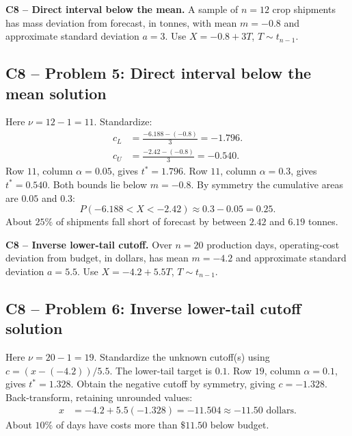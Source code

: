 {
\textbf{C8 -- Direct interval below the mean.} A sample of $n=12$ crop shipments has mass deviation from forecast, in tonnes, with mean $m=-0.8$ and approximate standard deviation $a=3$. Use $X=-0.8+3T$, $T\sim t_{n-1}$.
\label{sol:q5}
\subsection*{C8 -- Problem 5: Direct interval below the mean solution }
Here $\nu=12-1=11$. Standardize:
\[
\begin{aligned}
c_L&=\frac{-6.188-(-0.8)}{3}=-1.796.\\
c_U&=\frac{-2.42-(-0.8)}{3}=-0.540.
\end{aligned}
\]
Row $11$, column $\alpha=0.05$, gives $t^*=1.796$. Row $11$, column $\alpha=0.3$, gives $t^*=0.540$. 
Both bounds lie below $m=-0.8$. By symmetry the cumulative areas are $0.05$ and $0.3$:
\[
P(-6.188<X<-2.42)\approx0.3-0.05=\boxed{0.25}.
\]
About $25\%$ of shipments fall short of forecast by between $2.42$ and $6.19$ tonnes.
\secInicio[][sec:q5]
}

{
\textbf{C8 -- Inverse lower-tail cutoff.} Over $n=20$ production days, operating-cost deviation from budget, in dollars, has mean $m=-4.2$ and approximate standard deviation $a=5.5$. Use $X=-4.2+5.5T$, $T\sim t_{n-1}$.
\label{sol:q6}
\subsection*{C8 -- Problem 6: Inverse lower-tail cutoff solution }
Here $\nu=20-1=19$. Standardize the unknown cutoff(s) using $c=(x-(-4.2))/5.5$. The lower-tail target is $0.1$.
Row $19$, column $\alpha=0.1$, gives $t^*=1.328$. 
Obtain the negative cutoff by symmetry, giving $c=-1.328$.
Back-transform, retaining unrounded values:
\[
\begin{aligned}
x&=-4.2+5.5(-1.328)=-11.504\approx\boxed{-11.50\text{ dollars}}.
\end{aligned}
\]
About $10\%$ of days have costs more than $\$11.50$ below budget.
\secInicio[][sec:q6]
}

